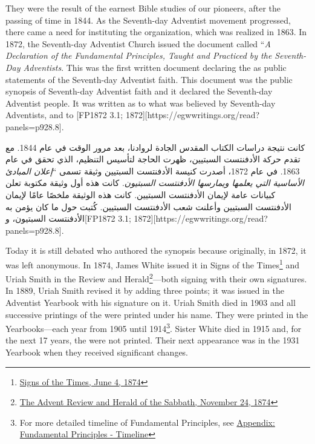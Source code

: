 They were the result of the earnest Bible studies of our pioneers, after the passing of time in 1844. As the Seventh-day Adventist movement progressed, there came a need for instituting the organization, which was realized in 1863. In 1872, the Seventh-day Adventist Church issued the document called “\textit{A Declaration of the Fundamental Principles, Taught and Practiced by the Seventh-Day Adventists}. This was the first written document declaring the  as public statements of the Seventh-day Adventist faith. This document was the public synopsis of Seventh-day Adventist faith and it declared  the Seventh-day Adventist people. It was written  as to what was believed by Seventh-day Adventists,  and to [FP1872 3.1; 1872][https://egwwritings.org/read?panels=p928.8].


كانت نتيجة دراسات الكتاب المقدس الجادة لروادنا، بعد مرور الوقت في عام 1844. مع تقدم حركة الأدفنتست السبتيين، ظهرت الحاجة لتأسيس التنظيم، الذي تحقق في عام 1863. في عام 1872، أصدرت كنيسة الأدفنتست السبتيين وثيقة تسمى “\textit{إعلان المبادئ الأساسية التي يعلمها ويمارسها الأدفنتست السبتيون}. كانت هذه أول وثيقة مكتوبة تعلن  كبيانات عامة لإيمان الأدفنتست السبتيين. كانت هذه الوثيقة ملخصًا عامًا لإيمان الأدفنتست السبتيين وأعلنت  شعب الأدفنتست السبتيين. كُتبت  حول ما كان يؤمن به الأدفنتست السبتيون،  و[FP1872 3.1; 1872][https://egwwritings.org/read?panels=p928.8].


Today it is still debated who authored the synopsis because originally, in 1872, it was left anonymous. In 1874, James White issued it in Signs of the Times\footnote{\href{https://adventistdigitallibrary.org/adl-364148/signs-times-june-4-1874}{Signs of the Times, June 4, 1874}} and Uriah Smith in the Review and Herald\footnote{\href{http://documents.adventistarchives.org/Periodicals/RH/RH18741124-V44-22.pdf}{The Advent Review and Herald of the Sabbath, November 24, 1874}}—both signing with their own signatures. In 1889, Uriah Smith revised it by adding three points; it was issued in the Adventist Yearbook with his signature on it. Uriah Smith died in 1903 and all successive printings of the  were printed under his name. They were printed in the Yearbooks—each year from 1905 until 1914\footnote{For more detailed timeline of Fundamental Principles, see \hyperref[appendix:timeline]{Appendix: Fundamental Principles - Timeline}}. Sister White died in 1915 and, for the next 17 years, the  were not printed. Their next appearance was in the 1931 Yearbook when they received significant changes.


